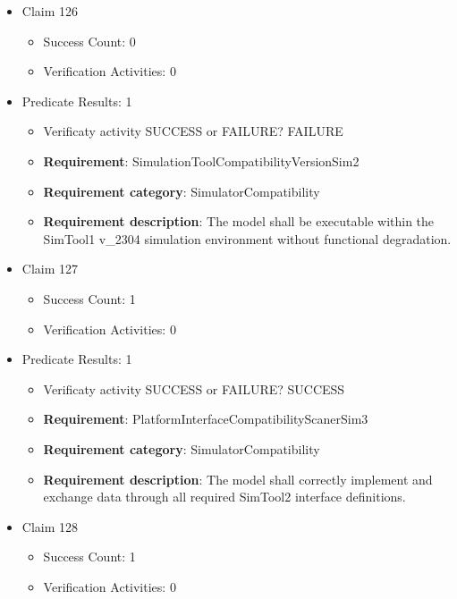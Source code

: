 \documentclass{article}
\begin{document}
\begin{itemize}
  				  \item Claim 126
				\begin{itemize}
			    	\item Success Count: 0 
			    	\item Verification Activities: 0
				\end{itemize}
				
									    
				\item Predicate Results: 1
					\begin{itemize}				
					\item Verificaty activity SUCCESS or FAILURE? FAILURE
					
					\item \textbf{Requirement}: SimulationToolCompatibilityVersionSim2 
					\item \textbf{Requirement category}: SimulatorCompatibility
					\item \textbf{Requirement description}: The model shall be executable within the SimTool1 v_2304 simulation environment without functional degradation.
					\end{itemize}

  				  \item Claim 127
				\begin{itemize}
			    	\item Success Count: 1 
			    	\item Verification Activities: 0
				\end{itemize}
				
									    
				\item Predicate Results: 1
					\begin{itemize}				
					\item Verificaty activity SUCCESS or FAILURE? SUCCESS
					
					\item \textbf{Requirement}: PlatformInterfaceCompatibilityScanerSim3 
					\item \textbf{Requirement category}: SimulatorCompatibility
					\item \textbf{Requirement description}: The model shall correctly implement and exchange data through all required SimTool2 interface definitions.
					\end{itemize}

  				  \item Claim 128
				\begin{itemize}
			    	\item Success Count: 1 
			    	\item Verification Activities: 0
				\end{itemize}
				

\end{itemize}
\end{document}
